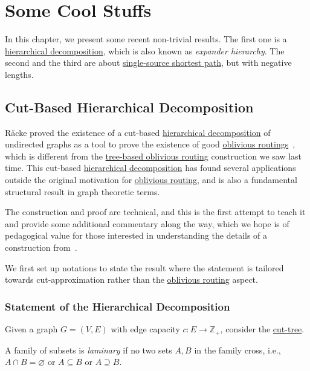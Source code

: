 \chapter{Some Cool Stuffs}
In this chapter, we present some recent non-trivial results. The first one is a \hyperref[def:hierarchical-decomposition]{hierarchical decomposition}, which is also known as \emph{expander hierarchy}. The second and the third are about \hyperref[prb:SSSP]{single-source shortest path}, but with negative lengths.

\section{Cut-Based Hierarchical Decomposition}
Räcke proved the existence of a cut-based \hyperref[def:hierarchical-decomposition]{hierarchical decomposition} of undirected graphs as a tool to prove the existence of good \hyperref[prb:oblivious-routing]{oblivious routings}~\cite{racke2002minimizing}, which is different from the \hyperref[not:tree-based-oblivious-routing]{tree-based oblivious routing} construction we saw last time. This cut-based \hyperref[def:hierarchical-decomposition]{hierarchical decomposition} has found several applications outside the original motivation for \hyperref[prb:oblivious-routing]{oblivious routing}, and is also a fundamental structural result in graph theoretic terms.

\begin{note}
	The construction and proof are technical, and this is the first attempt to teach it and provide some additional commentary along the way, which we hope is of pedagogical value for those interested in understanding the details of a construction from~\cite{bienkowski2003practical}.
\end{note}

We first set up notations to state the result where the statement is tailored towards cut-approximation rather than the \hyperref[prb:oblivious-routing]{oblivious routing} aspect.

\subsection{Statement of the Hierarchical Decomposition}
Given a graph \(G = (V, E)\) with edge capacity \(c \colon E \to \mathbb{Z} _{+}\), consider the \hyperref[def:cut-tree]{cut-tree}.

\begin{definition}[Laminary]\label{def:laminary}
	A family of subsets is \emph{laminary} if no two sets \(A, B\) in the family cross, i.e., \(A \cap B = \varnothing \) or \(A \subseteq B\) or \(A \supseteq B\).
\end{definition}

